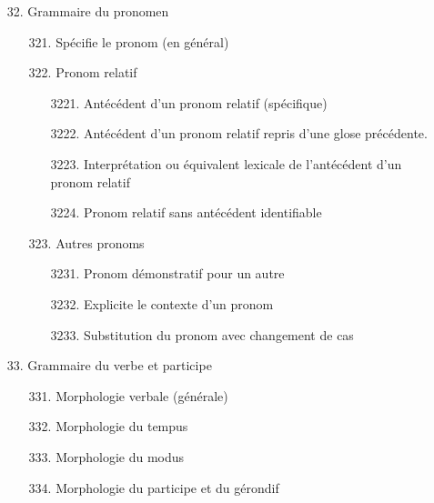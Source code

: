 \documentclass[a4paper, twoside, 12pt]{book}
\begin{document}
{\begin{enumerate}
\begin{enumerate}
\begin{enumerate}
\begin{enumerate}
        \item[3112.] Vocatif
        \item[3113.] Génitif
        \item[3114.] Datif
        \item[3115.] Accusatif
        \item[3116.] Ablatif
      \end{enumerate}
      \item[312.] Nombre
      \item[313.] Genre et autres points morphologiques
    \end{enumerate}
    \item[32.] Grammaire du pronomen
    \begin{enumerate}
      \item[321.] Spécifie le pronom (en général)
      \item[322.] Pronom relatif
      \begin{enumerate}
        \item[3221.] Antécédent d'un pronom relatif (spécifique)
        \item[3222.] Antécédent d'un pronom relatif repris d'une glose précédente.
        \item[3223.] Interprétation ou équivalent lexicale de l'antécédent d'un pronom relatif
        \item[3224.] Pronom relatif sans antécédent identifiable
      \end{enumerate}
      \item[323.] Autres pronoms
      \begin{enumerate}
        \item[3231.] Pronom démonstratif pour un autre
        \item[3232.] Explicite le contexte d'un pronom
        \item[3233.] Substitution du pronom avec changement de cas
      \end{enumerate}
    \end{enumerate}
    \item[33.] Grammaire du verbe et participe
    \begin{enumerate}
      \item[331.] Morphologie verbale (générale)
      \item[332.] Morphologie du tempus
      \item[333.] Morphologie du modus
      \item[334.] Morphologie du participe et du gérondif
    \end{enumerate}

\end{enumerate}
\end{enumerate}}
\end{document}
